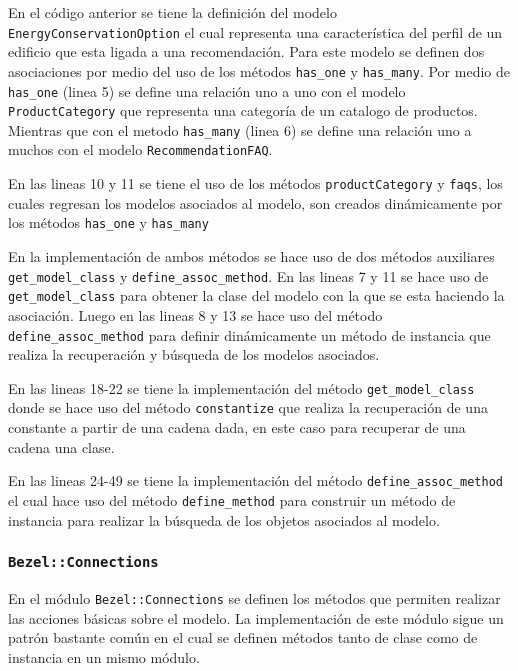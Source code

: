 

En el código anterior se tiene la definición del modelo
\texttt{EnergyConservationOption} el cual representa una característica del perfil
de un edificio que esta ligada a una recomendación. Para este modelo se definen
dos asociaciones por medio del uso de los métodos \texttt{has\_one} y
\texttt{has\_many}. Por medio de \texttt{has\_one} (linea 5) se define una relación
uno a uno con el modelo \texttt{ProductCategory} que representa una categoría de un
catalogo de productos. Mientras que con el metodo \texttt{has\_many} (linea 6) se
define una relación uno a muchos con el modelo \texttt{RecommendationFAQ}.

En las lineas 10 y 11 se tiene el uso de los métodos \texttt{productCategory} y
\texttt{faqs}, los cuales regresan los modelos asociados al modelo, son creados
dinámicamente por los métodos \texttt{has\_one} y \texttt{has\_many}



En la implementación de ambos métodos se hace uso de dos métodos auxiliares
\texttt{get\_model\_class} y \texttt{define\_assoc\_method}.
En las lineas 7 y 11 se hace uso de \texttt{get\_model\_class} para obtener
la clase del modelo con la que se esta haciendo la asociación. Luego en las
lineas 8 y 13 se hace uso del método \texttt{define\_assoc\_method} para
definir dinámicamente un método de instancia que realiza la recuperación
y búsqueda de los modelos asociados.

En las lineas 18-22 se tiene la implementación del método \texttt{get\_model\_class}
donde se hace uso del método \texttt{constantize} que realiza la recuperación
de una constante a partir de una cadena dada, en este caso para recuperar de
una cadena una clase.

En las lineas 24-49 se tiene la implementación del método
\texttt{define\_assoc\_method} el cual hace uso del método \texttt{define\_method}
para construir un método de instancia para realizar la búsqueda de los objetos
asociados al modelo.

\subsubsection{\texttt{Bezel::Connections}}

En el módulo \texttt{Bezel::Connections} se definen los métodos que permiten
realizar las acciones básicas sobre el modelo. La implementación de este módulo
sigue un patrón bastante común en el cual se definen métodos tanto de clase
como de instancia en un mismo módulo.

